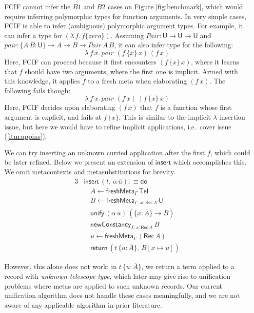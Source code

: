 \documentclass[acmsmall,review,anonymous,prologue,dvipsnames]{acmart}\settopmatter{printfolios=true,printccs=false,printacmref=false}
\renewcommand{\U}{\mathsf{U}}
\newcommand{\unify}{\mathsf{unify}}
\newcommand{\mi}[1]{\mathit{#1}}
\newcommand{\edo}{\boldsymbol{\mathsf{do}}}
\newcommand{\ereturn}{\boldsymbol{\mathsf{return}}}
\newcommand{\einsert}{\mathsf{insert}}
\newcommand{\Tel}{\mathsf{Tel}}
\newcommand{\Rec}{\mathsf{Rec}}
\newcommand{\ol}[1]{\overline{#1}}
\theoremstyle{remark}
\begin{document}
FCIF cannot infer the $B1$ and $B2$ cases on Figure \ref{fig:benchmark}, which
would require inferring polymorphic types for function arguments. In very simple
cases, FCIF is able to infer (ambiguous) polymorphic argument types. For
example, it can infer a type for $(\lambda\,f.\,f\{\mi{zero}\})$. Assuming
$\mi{Pair} : \U \to \U \to \U$ and $\mi{pair}: \{A\,B : \U\}\to A \to B \to
\mi{Pair}\,A\,B$, it can also infer type for the following:
\[
    \lambda\,f\,x.\,\mi{pair}\,\,(f\,\{x\}\,x)\,(f\,x)
\]
Here, FCIF can proceed because it first encounters $(f\,\{x\}\,x)$, where it
learns that $f$ should have two arguments, where the first one is implicit.
Armed with this knowledge, it applies $f$ to a fresh meta when elaborating
$(f\,x)$. The following fails though:
\[
    \lambda\,f\,x.\,\mi{pair}\,\,(f\,x)\,(f\,\{x\}\,x)
\]
Here, FCIF decides upon elaborating $(f\,x)$ that $f$ is a function whose first
argument is explicit, and fails at $f\,\{x\}$. This is similar to the implicit
$\lambda$ insertion issue, but here we would have to refine implicit
applications, i.e.\ cover issue (\ref{itm:appins}).

We can try inserting an unknown curried application after the first $f$, which
could be later refined. Below we present an extension of $\einsert$ which
accomplishes this. We omit metacontexts and metasubstitutions for brevity.
\begin{alignat*}{3}
& \einsert\,(t,\,\alpha\,\ol{u}) :\equiv \edo \\
& \quad A \leftarrow \mathsf{freshMeta}_{\Gamma}\,\Tel\\
& \quad B \leftarrow \mathsf{freshMeta}_{\Gamma,\,x: \Rec\,A}\,\U\\
& \quad \unify\,(\alpha\,\ol{u})\,(\{x : \ol{A}\} \to B)\\
& \quad \mathsf{newConstancy}_{\Gamma, x : \Rec\,A}\,B\\
& \quad u \leftarrow \mathsf{freshMeta}_{\Gamma}\,(\Rec\,A)\\
& \quad \ereturn\,(t\,\{u : \ol{A}\},\,B[x \mapsto u])
\end{alignat*}

However, this alone does not work: in $t\,\{u : \ol{A}\}$, we return a term
applied to a record with \emph{unknown telescope type}, which later may give
rise to unification problems where metas are applied to such unknown records.
Our current unification algorithm does not handle these cases meaningfully, and
we are not aware of any applicable algorithm in prior literature.
\end{document}
